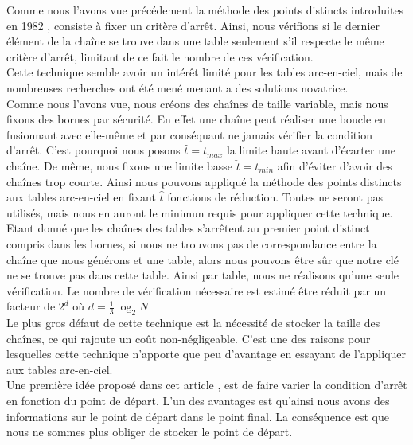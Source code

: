 	Comme nous l'avons vue précédement la méthode des points distincts introduites en 1982 \cite{Rivest}, consiste à fixer un critère d'arrêt. Ainsi, nous vérifions si le dernier élément de la chaîne se trouve dans une table seulement s'il respecte le même critère d'arrêt, limitant de ce fait le nombre de ces vérification.\\

	Cette technique semble avoir un intérêt limité pour les tables arc-en-ciel, mais de nombreuses recherches ont été mené menant a des solutions novatrice.\\

	Comme nous l'avons vue, nous créons des chaînes de taille variable, mais nous fixons des bornes par sécurité. En effet une chaîne peut réaliser une boucle en fusionnant avec elle-même et par conséquant ne jamais vérifier la condition d'arrêt. C'est pourquoi nous posons $\hat{t}=t_{max}$ la limite haute avant d'écarter une chaîne. De même, nous fixons une limite basse $\check{t}=t_{min}$ afin d'éviter d'avoir des chaînes trop courte. Ainsi nous pouvons appliqué la méthode des points distincts aux tables arc-en-ciel en fixant $\hat{t}$ fonctions de réduction. Toutes ne seront pas utilisés, mais nous en auront le minimun requis pour appliquer cette technique.\\

	Etant donné que les chaînes des tables s'arrêtent au premier point distinct compris dans les bornes, si nous ne trouvons pas de correspondance entre la chaîne que nous générons et une table, alors nous pouvons être sûr que notre clé ne se trouve pas dans cette table. Ainsi par table, nous ne réalisons qu'une seule vérification. Le nombre de vérification nécessaire est estimé être réduit par un facteur de $2^d$ où $d=\frac{1}{3}\log_2 N$\\

	Le plus gros défaut de cette technique est la nécessité de stocker la taille des chaînes, ce qui rajoute un coût non-négligeable. C'est une des raisons pour lesquelles cette technique n'apporte que peu d'avantage en essayant de l'appliquer aux tables arc-en-ciel.\\
	Une première idée proposé dans cet article \cite{VDP}, est de faire varier la condition d'arrêt en fonction du point de départ. L'un des avantages est qu'ainsi nous avons des informations sur le point de départ dans le point final. La conséquence est que nous ne sommes plus obliger de stocker le point de départ.\\
	
